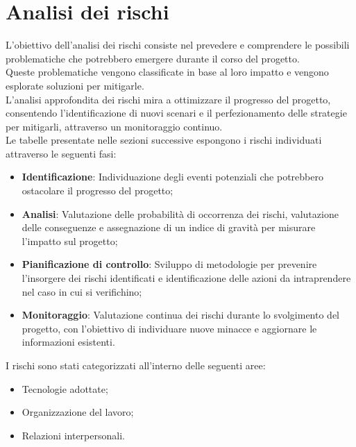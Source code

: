 \nonstopmode
\pagebreak
\section{Analisi dei rischi}
L'obiettivo dell'analisi dei rischi consiste nel prevedere e comprendere
le possibili problematiche che potrebbero emergere durante il corso del progetto. \\
Queste problematiche vengono classificate in base al loro impatto e vengono esplorate soluzioni per mitigarle.\\
L'analisi approfondita dei rischi mira a ottimizzare il progresso del progetto, consentendo l'identificazione di nuovi scenari e il perfezionamento
delle strategie per mitigarli, attraverso un monitoraggio continuo. \\

Le tabelle presentate nelle sezioni successive espongono i rischi individuati attraverso
le seguenti fasi:

\begin{itemize}
\item \textbf{Identificazione}: Individuazione degli eventi potenziali che potrebbero ostacolare il progresso del progetto;
\item \textbf{Analisi}: Valutazione delle probabilità di occorrenza dei rischi, valutazione delle conseguenze e assegnazione di un indice di gravità per misurare l'impatto sul progetto;
\item \textbf{Pianificazione di controllo}: Sviluppo di metodologie per prevenire l'insorgere dei rischi identificati e identificazione delle azioni da intraprendere nel caso in cui si verifichino;
\item \textbf{Monitoraggio}: Valutazione continua dei rischi durante lo svolgimento del progetto, con l'obiettivo di individuare nuove minacce e aggiornare le informazioni esistenti.
\end{itemize}

I rischi sono stati categorizzati all'interno delle seguenti aree:

\begin{itemize}
\item Tecnologie adottate;
\item Organizzazione del lavoro;
\item Relazioni interpersonali.
\end{itemize}
